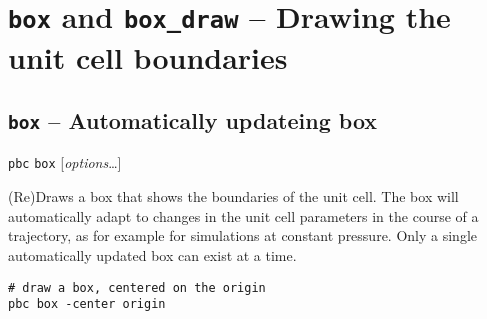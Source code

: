\documentclass[a4paper, DIV12]{scrartcl}
\begin{document}
\newpage
\section{\texttt{box} and \texttt{box\_draw} -- Drawing the unit cell boundaries}

\subsection{\texttt{box} -- Automatically updateing box}
\label{sec:box}


\texttt{pbc} \texttt{box} [\textit{options}\dots]


(Re)Draws a box that shows the boundaries of the unit cell. The box
will automatically adapt to changes in the unit cell parameters in the
course of a trajectory, as for example for simulations at constant
pressure. Only a single automatically updated box can exist at a time.


\begin{Verbatim}
# draw a box, centered on the origin
pbc box -center origin
\end{Verbatim}

\end{document}
